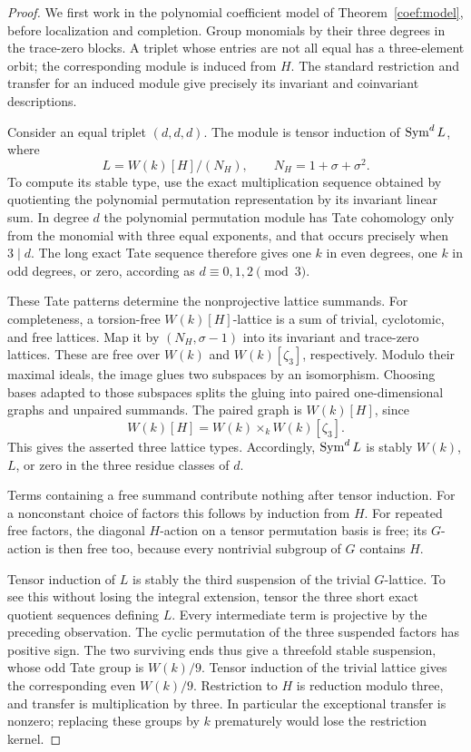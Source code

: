 \begin{proof}
We first work in the polynomial coefficient model of
Theorem~\ref{coef:model}, before localization and completion.  Group
monomials by their three degrees in the trace-zero blocks.  A
triplet whose entries are not all equal has a three-element orbit;
the corresponding module is induced from $H$.  The standard
restriction and transfer for an induced module give precisely its
invariant and coinvariant descriptions.

Consider an equal triplet $(d,d,d)$.  The module is tensor induction
of $\operatorname{Sym}^d L$, where
\[
 L=W(k)[H]/(N_H),\qquad N_H=1+\sigma+\sigma^2.
\]
To compute its stable type, use the exact multiplication sequence
obtained by quotienting the polynomial permutation representation
by its invariant linear sum.  In degree $d$ the polynomial
permutation module has Tate cohomology only from the monomial with
three equal exponents, and that occurs precisely when $3\mid d$.
The long exact Tate sequence therefore gives one $k$ in even
degrees, one $k$ in odd degrees, or zero, according as
$d\equiv0,1,2\pmod3$.

These Tate patterns determine the nonprojective lattice summands.
For completeness, a torsion-free $W(k)[H]$-lattice is a sum of
trivial, cyclotomic, and free lattices.  Map it by $(N_H,\sigma-1)$
into its invariant and trace-zero lattices.  These are free over
$W(k)$ and $W(k)[\zeta_3]$, respectively.  Modulo their maximal
ideals, the image glues two subspaces by an isomorphism.  Choosing
bases adapted to those subspaces splits the gluing into paired
one-dimensional graphs and unpaired summands.  The paired graph
is $W(k)[H]$, since
\[
 W(k)[H]=W(k)\mathbin{\times}_{k}W(k)[\zeta_3].
\]
This gives the asserted three lattice types.  Accordingly,
$\operatorname{Sym}^dL$ is stably $W(k)$, $L$, or zero in the three residue
classes of $d$.

Terms containing a free summand contribute nothing after tensor
induction.  For a nonconstant choice of factors this follows by
induction from $H$.  For repeated free factors, the diagonal
$H$-action on a tensor permutation basis is free; its $G$-action
is then free too, because every nontrivial subgroup of $G$
contains $H$.

Tensor induction of $L$ is stably the third suspension of the
trivial $G$-lattice.  To see this without losing the integral
extension, tensor the three short exact quotient sequences
defining $L$.  Every intermediate term is projective by the
preceding observation.  The cyclic permutation of the three
suspended factors has positive sign.  The two surviving ends thus
give a threefold stable suspension, whose odd Tate group is
$W(k)/9$.  Tensor induction of the trivial lattice gives the
corresponding even $W(k)/9$.  Restriction to $H$ is reduction
modulo three, and transfer is multiplication by three.  In
particular the exceptional transfer is nonzero; replacing these
groups by $k$ prematurely would lose the restriction kernel.


\end{proof}
